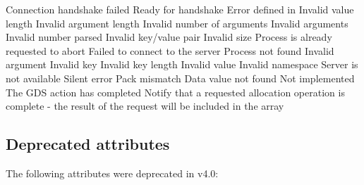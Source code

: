 \begin{constantdesc}
%
Connection handshake failed
%
Ready for handshake
%
Error defined in 
%
Invalid value length
%
Invalid argument length
%
Invalid number of arguments
%
Invalid arguments
%
Invalid number parsed
%
Invalid key/value pair
%
Invalid size
%
Process is already requested to abort
%
Failed to connect to the server
%
Process not found
%
Invalid argument
%
Invalid key
%
Invalid key length
%
Invalid value
%
Invalid namespace
%
Server is not available
%
Silent error
%
Pack mismatch
%
Data value not found
%
Not implemented
%
The \ac{GDS} action has completed
%
Notify that a requested allocation operation is complete - the result of
the request will be included in the  array
%
\end{constantdesc}

\subsection{Deprecated attributes}

The following attributes were deprecated in v4.0:

